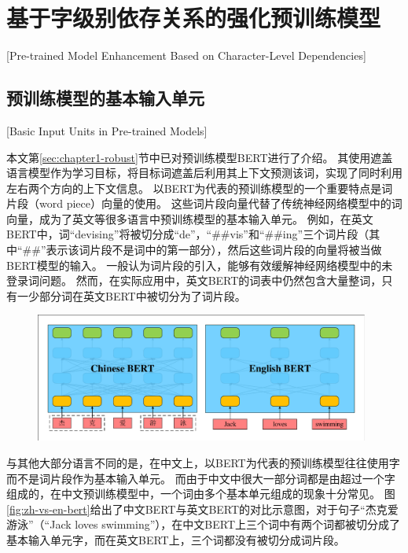 \section{基于字级别依存关系的强化预训练模型}[Pre-trained Model Enhancement Based on Character-Level Dependencies]

\subsection{预训练模型的基本输入单元}[Basic Input Units in Pre-trained Models]

本文第\ref{sec:chapter1-robust}节中已对预训练模型BERT进行了介绍。
其使用遮盖语言模型作为学习目标，将目标词遮盖后利用其上下文预测该词，实现了同时利用左右两个方向的上下文信息。
以BERT为代表的预训练模型的一个重要特点是词片段（word piece）向量\cite{wu-etal-2016-google}的使用。
这些词片段向量代替了传统神经网络模型中的词向量，成为了英文等很多语言中预训练模型的基本输入单元。
例如，在英文BERT中，词“devising”将被切分成“de”，“\#\#vis”和“\#\#ing”三个词片段（其中“\#\#”表示该词片段不是词中的第一部分），然后这些词片段的向量将被当做BERT模型的输入。
一般认为词片段的引入，能够有效缓解神经网络模型中的未登录词问题。
然而，在实际应用中，英文BERT的词表中仍然包含大量整词，只有一少部分词在英文BERT中被切分为了词片段。

\begin{figure}[hbtp]
	\centering
	\includegraphics[width=0.98\textwidth]{figures/zh-vs-en-bert.pdf}
\end{figure}

与其他大部分语言不同的是，在中文上，以BERT为代表的预训练模型往往使用字而不是词片段作为基本输入单元。
而由于中文中很大一部分词都是由超过一个字组成的，在中文预训练模型中，一个词由多个基本单元组成的现象十分常见。
图\ref{fig:zh-vs-en-bert}给出了中文BERT与英文BERT的对比示意图，对于句子“杰克爱游泳”（“Jack loves swimming”），在中文BERT上三个词中有两个词都被切分成了基本输入单元字，而在英文BERT上，三个词都没有被切分成词片段。

